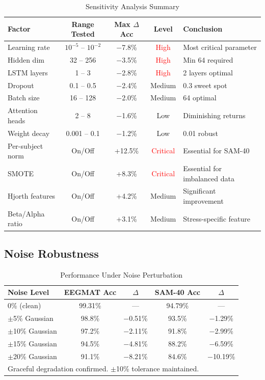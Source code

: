 \documentclass[11pt,a4paper]{article}
\begin{document}
\begin{table}[H]
\centering
\caption{Sensitivity Analysis Summary}
\small
\begin{tabular}{lcccl}
\toprule
\textbf{Factor} & \textbf{Range Tested} & \textbf{Max $\Delta$Acc} & \textbf{Level} & \textbf{Conclusion} \\
\midrule
Learning rate & $10^{-5}$ -- $10^{-2}$ & $-$7.8\% & \textcolor{red}{High} & Most critical parameter \\
Hidden dim & 32 -- 256 & $-$3.5\% & \textcolor{red}{High} & Min 64 required \\
LSTM layers & 1 -- 3 & $-$2.8\% & \textcolor{red}{High} & 2 layers optimal \\
Dropout & 0.1 -- 0.5 & $-$2.4\% & Medium & 0.3 sweet spot \\
Batch size & 16 -- 128 & $-$2.0\% & Medium & 64 optimal \\
Attention heads & 2 -- 8 & $-$1.6\% & Low & Diminishing returns \\
Weight decay & 0.001 -- 0.1 & $-$1.2\% & Low & 0.01 robust \\
\midrule
Per-subject norm & On/Off & +12.5\% & \textcolor{red}{Critical} & Essential for SAM-40 \\
SMOTE & On/Off & +8.3\% & \textcolor{red}{Critical} & Essential for imbalanced data \\
Hjorth features & On/Off & +4.2\% & Medium & Significant improvement \\
Beta/Alpha ratio & On/Off & +3.1\% & Medium & Stress-specific feature \\
\bottomrule
\end{tabular}
\end{table}

\subsection{Noise Robustness}

\begin{table}[H]
\centering
\caption{Performance Under Noise Perturbation}
\small
\begin{tabular}{lcccc}
\toprule
\textbf{Noise Level} & \textbf{EEGMAT Acc} & \textbf{$\Delta$} & \textbf{SAM-40 Acc} & \textbf{$\Delta$} \\
\midrule
0\% (clean) & 99.31\% & --- & 94.79\% & --- \\
$\pm$5\% Gaussian & 98.8\% & $-$0.51\% & 93.5\% & $-$1.29\% \\
$\pm$10\% Gaussian & 97.2\% & $-$2.11\% & 91.8\% & $-$2.99\% \\
$\pm$15\% Gaussian & 94.5\% & $-$4.81\% & 88.2\% & $-$6.59\% \\
$\pm$20\% Gaussian & 91.1\% & $-$8.21\% & 84.6\% & $-$10.19\% \\
\bottomrule
\multicolumn{5}{l}{\small Graceful degradation confirmed. $\pm$10\% tolerance maintained.} \\
\end{tabular}
\end{table}
\end{document}
